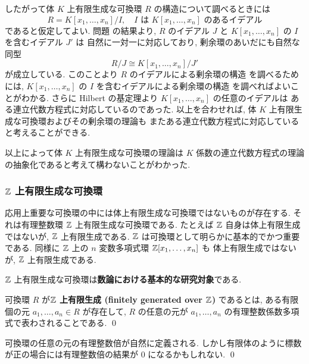 \documentclass[12pt,twoside]{jarticle}
\begin{document}
したがって体 $K$ 上有限生成な可換環 $R$ の構造について調べるときには
\begin{equation*}
 R = K[x_1,\ldots,x_n]/I, 
 \quad \text{$I$ は $K[x_1,\ldots,x_n]$ のあるイデアル}
\end{equation*}
であると仮定してよい.  
問題  の結果より, %
$R$ のイデアル $J$ 
と $K[x_1,\ldots,x_n]$ の $I$ を含むイデアル $J'$ は
自然に一対一に対応しており, 剰余環のあいだにも自然な同型
\begin{equation*}
 R/J \cong K[x_1,\ldots,x_n]/J'
\end{equation*}
が成立している.  このことより $R$ のイデアルによる剰余環の構造
を調べるためには, 
$K[x_1,\ldots,x_n]$ の $I$ を含むイデアルによる剰余環の構造
を調べればよいことがわかる.
さらに Hilbert の基定理より $K[x_1,\ldots,x_n]$ の任意のイデアルは
ある連立代数方程式に対応しているのであった.
以上を合わせれば, 
体 $K$ 上有限生成な可換環およびその剰余環の理論も
またある連立代数方程式に対応していると考えることができる.

以上によって体 $K$ 上有限生成な可換環の理論は %
$K$ 係数の連立代数方程式の理論の抽象化であると考えて構わないことがわかった.

\subsubsection{${\mathbb Z}$ 上有限生成な可換環}

応用上重要な可換環の中には体上有限生成な可換環ではないものが存在する.
それは有理整数環 ${\mathbb Z}$ 上有限生成な可換環である.
たとえば ${\mathbb Z}$ 自身は体上有限生成ではないが, ${\mathbb Z}$ 上有限生成である.
${\mathbb Z}$ は可換環として明らかに基本的でかつ重要である.
同様に ${\mathbb Z}$ 上の $n$ 変数多項式環 ${\mathbb Z}[x_1,\ldots,x_n]$ も
体上有限生成ではないが, ${\mathbb Z}$ 上有限生成である.

${\mathbb Z}$ 上有限生成な可換環は{\bf 数論における基本的な研究対象}である.

\begin{definition}[体 $K$ 上有限生成]
 可換環 $R$ が{\bf ${\mathbb Z}$ 上有限生成 (finitely generated over ${\mathbb Z}$)}
 であるとは, ある有限個の元 $a_1,\ldots,a_n\in R$ が存在して, 
 $R$ の任意の元が $a_1,\ldots,a_n$ の有理整数係数多項式で表わされることである.
 \qed
\end{definition}

\begin{rem}
 可換環の任意の元の有理整数倍が自然に定義される.
 しかし有限体のように標数が正の場合には有理整数倍の結果が $0$
 になるかもしれない. \qed
\end{rem}
\end{document}
